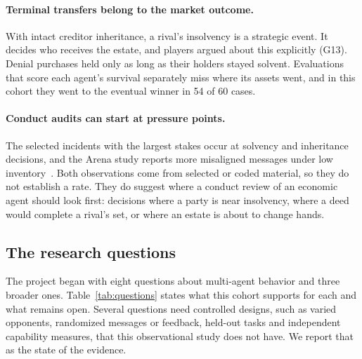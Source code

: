 \paragraph{Terminal transfers belong to the market outcome.} With intact creditor inheritance, a rival's insolvency is a strategic event. It decides who receives the estate, and players argued about this explicitly (G13). Denial purchases held only as long as their holders stayed solvent. Evaluations that score each agent's survival separately miss where its assets went, and in this cohort they went to the eventual winner in 54 of 60 cases.

\paragraph{Conduct audits can start at pressure points.} The selected incidents with the largest stakes occur at solvency and inheritance decisions, and the Arena study reports more misaligned messages under low inventory~\cite{li2026arena}. Both observations come from selected or coded material, so they do not establish a rate. They do suggest where a conduct review of an economic agent should look first: decisions where a party is near insolvency, where a deed would complete a rival's set, or where an estate is about to change hands.

\subsection{The research questions}
\label{sec:questions}

The project began with eight questions about multi-agent behavior and three broader ones. Table~\ref{tab:questions} states what this cohort supports for each and what remains open. Several questions need controlled designs, such as varied opponents, randomized messages or feedback, held-out tasks and independent capability measures, that this observational study does not have. We report that as the state of the evidence.

